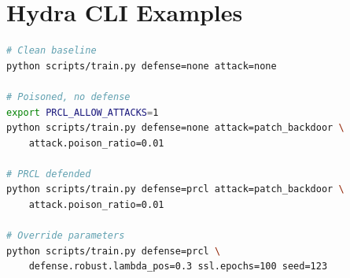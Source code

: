 \documentclass[11pt,a4paper]{article}
\begin{document}
\section{Hydra CLI Examples}
\label{app:cli}

\begin{lstlisting}[language=bash,basicstyle=\ttfamily\footnotesize]
# Clean baseline
python scripts/train.py defense=none attack=none

# Poisoned, no defense
export PRCL_ALLOW_ATTACKS=1
python scripts/train.py defense=none attack=patch_backdoor \
    attack.poison_ratio=0.01

# PRCL defended
python scripts/train.py defense=prcl attack=patch_backdoor \
    attack.poison_ratio=0.01

# Override parameters
python scripts/train.py defense=prcl \
    defense.robust.lambda_pos=0.3 ssl.epochs=100 seed=123
\end{lstlisting}
\end{document}
